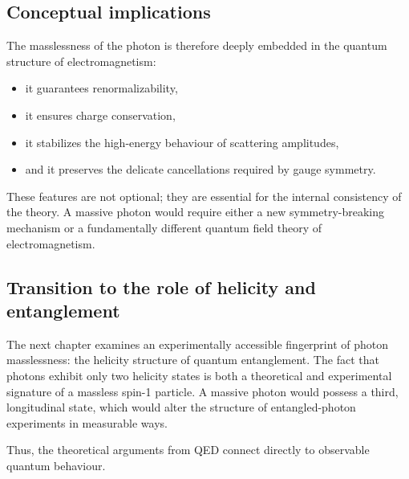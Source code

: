 \subsection*{Conceptual implications}

The masslessness of the photon is therefore deeply embedded in the quantum 
structure of electromagnetism:

\begin{itemize}
	\item it guarantees renormalizability,
	\item it ensures charge conservation,
	\item it stabilizes the high-energy behaviour of scattering amplitudes,
	\item and it preserves the delicate cancellations required by gauge 
	symmetry.
\end{itemize}

These features are not optional; they are essential for the internal 
consistency of the theory. A massive photon would require either a new 
symmetry-breaking mechanism or a fundamentally different quantum field 
theory of electromagnetism.

\subsection*{Transition to the role of helicity and entanglement}

The next chapter examines an experimentally accessible fingerprint of 
photon masslessness: the helicity structure of quantum entanglement. 
The fact that photons exhibit only two helicity states is both a theoretical 
and experimental signature of a massless spin-1 particle. A massive photon 
would possess a third, longitudinal state, which would alter the structure 
of entangled-photon experiments in measurable ways.

Thus, the theoretical arguments from QED connect directly to observable 
quantum behaviour.
